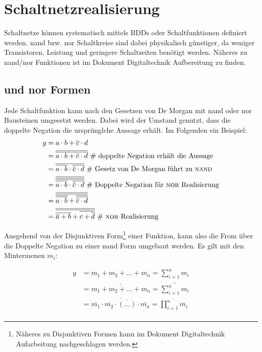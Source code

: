 
\chapter{Schaltnetzrealisierung}
Schaltnetze können systematisch mittels BDDs oder Schaltfunktionen definiert werden. 
{\sc nand} bzw. {\sc nor} Schaltkreise sind dabei physikalisch günstiger, da weniger Transistoren, Leistung und geringere Schaltzeiten benötigt werden. Näheres zu {\sc nand}/{\sc nor} Funktionen ist im Dokument Digitaltechnik Aufbereitung zu finden. 

\section{{} und {\sc nor} Formen}
Jede Schaltfunktion kann nach den Gesetzen von De Morgan mit {\sc nand} oder {\sc nor} Bausteinen umgesetzt werden. Dabei wird der Umstand genutzt, dass die doppelte Negation die ursprünglche Aussage erhält. Im Folgenden ein Beispiel:
\begin{align*}
y &= a \cdot b + \overline{c} \cdot d \\
  &= \overline{\overline{a \cdot b + \overline{c} \cdot d}} 
  	\textnormal{ \# doppelte Negation erhält die Aussage} \\
  &= \overline{\overline{a \cdot b} \cdot \overline{\overline{c} \cdot d}}
  \textnormal{ \# Gesetz von De Morgan führt zu {\sc nand}} \\
  &= \overline{\overline{\overline{\overline{a \cdot b} \cdot \overline{\overline{c} \cdot d}}}} 
  	\textnormal{ \# Doppelte Negation für {\sc nor} Realisierung} \\ 
  &= \overline{\overline{\overline{\overline{a \cdot b}} + \overline{\overline{\overline{c} \cdot d}}}} \\
  &= \overline{\overline{\overline{\overline{a} + b} + \overline{c + \overline{d}}}} \textnormal{ \# {\sc nor} Realisierung}\\
\end{align*}

Ausgehend von der Disjunktiven Form\footnote{Näheres zu Disjunktiven Formen kann im Dokument Digitaltechnik Aufarbeitung nachgeschlagen werden.} einer Funktion, kann also die From über die Doppelte Negation zu einer {\sc nand} Form umgebaut werden. Es gilt mit den Mintermenen $m_i$:

\begin{align*}
	y &= m_1 + m_2 + \ldots + m_n = \sum_{i=1}^n m_i \\
	  &= \overline{\overline{m_1 + m_2 + \ldots + m_n}} = \overline{\overline{\sum_{i=1}^n m_i}} \\
	  &= \overline{\overline{m_1} \cdot \overline{m_2} \cdot \overline{(\ldots)} \cdot \overline{m_n}} 
	   = \overline{\prod_{i=1}^n \overline{m_i}} \\
\end{align*}

